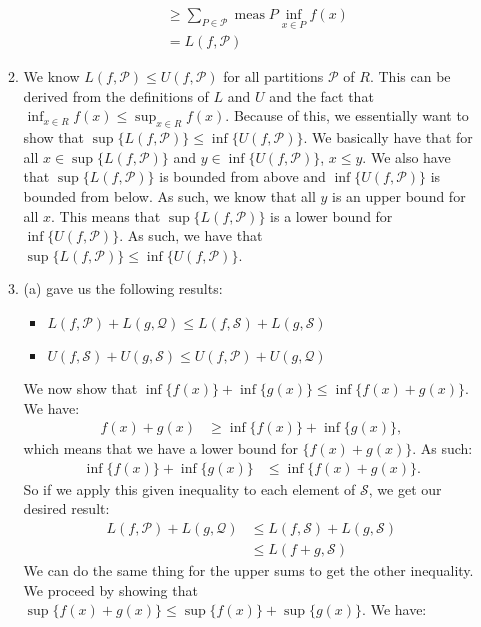 \documentclass{article}%
\begin{document}
\begin{enumerate}
\begin{enumerate}
\begin{align*}
            &\geq \sum_{P \in \mathcal{P}} \operatorname{meas} P \inf_{x \in P}f(x)\\
            &= L(f, \mathcal{P})
        \end{align*}
        \item We know $L(f, \mathcal{P}) \leq U(f, \mathcal{P})$ for all partitions $\mathcal{P}$ of $R$. This can be derived from the definitions of $L$ and $U$ and the fact that $\inf_{x \in R}f(x) \leq \sup_{x \in R}f(x)$. Because of this, we essentially want to show that $\sup\{L(f, \mathcal{P})\} \leq \inf\{U(f, \mathcal{P})\}$. We basically have that for all $x \in \sup\{L(f, \mathcal{P})\}$ and $y \in \inf\{U(f, \mathcal{P})\}$, $x \leq y$. We also have that $\sup\{L(f, \mathcal{P})\}$ is bounded from above and $\inf\{U(f, \mathcal{P})\}$ is bounded from below. As such, we know that all $y$ is an upper bound for all $x$. This means that $\sup\{L(f, \mathcal{P})\}$ is a lower bound for $\inf\{U(f, \mathcal{P})\}$. As such, we have that $\sup\{L(f, \mathcal{P})\} \leq \inf\{U(f, \mathcal{P})\}$.
        \item (a) gave us the following results:
        \begin{itemize}
            \item $L(f, \mathcal{P}) + L(g, \mathcal{Q}) \leq L(f, \mathcal{S}) + L(g, \mathcal{S})$
            \item $U(f, \mathcal{S}) + U(g, \mathcal{S}) \leq U(f, \mathcal{P}) + U(g, \mathcal{Q})$
        \end{itemize}
        We now show that $\inf\{f(x)\} + \inf\{g(x)\} \leq \inf\{f(x) + g(x)\}$. We have:
        \begin{align*}
            f(x) + g(x) &\geq \inf\{f(x)\} + \inf\{g(x)\},
        \end{align*}
        which means that we have a lower bound for $\{f(x) + g(x)\}$. As such:
        \begin{align*}
            \inf\{f(x)\} + \inf\{g(x)\} &\leq \inf\{f(x) + g(x)\}.
        \end{align*}
        So if we apply this given inequality to each element of $\mathcal{S}$, we get our desired result:
        \begin{align*}
            L(f, \mathcal{P}) + L(g, \mathcal{Q}) &\leq L(f, \mathcal{S}) + L(g, \mathcal{S})\\
            &\leq L(f + g, \mathcal{S})
        \end{align*}
        We can do the same thing for the upper sums to get the other inequality. We proceed by showing that $\sup\{f(x) + g(x)\} \leq \sup\{f(x)\} + \sup\{g(x)\}$. We have:

\end{enumerate}
\end{enumerate}
\end{document}
